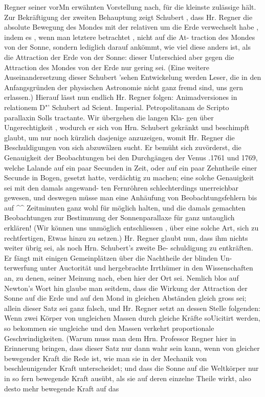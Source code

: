 \documentclass[12pt,a4paper]{article}
\begin{document}
Regner  seiner  vorMn  erwähnten  Vorstellung  nach,  für  die  kleinste  zulässige  hält.  Zur  Bekräftigung der  zweiten  Behauptung  zeigt  Schubert  ,  dass  Hr.  Regner  die  absolute  Bewegung  des  Mondes  mit  der relativen  um  die  Erde  verwechselt  habe ,  indem  es ,  wenn  man  letztere  betrachtet ,  nicht  auf  die  At- traction  des  Mondes  von  der  Sonne,  sondern  lediglich  darauf  ankömmt,  wie  viel  diese  anders  ist,  als die  Attraction  der  Erde  von  der  Sonne:  dieser  Unterschied  aber  gegen  die  Attraction  des  Mondes  von der  Erde  nur  gering  sei.  (Eine  weitere  Auseinandersetzung  dieser  Schubert 'sehen  Entwickelung  werden Leser,  die  in  den  Anfangsgründen  der  physischen  Astronomie  nicht  ganz  fremd  sind,  uns  gern  erlassen.) Hierauf  lässt  nun  endlich  Hr.  Regner  folgen:  Animadversiones  in  relationem  D"'  Schubert  ad Scient.  Imperial.  Petropolitanam  de  Scripto  parallaxin  Solls  tractante.  Wir  übergehen  die  langen  Kla- gen über  Ungerechtigkeit ,  wodurch  er  sich  von  Hrn.  Schubert  gekränkt  und  beschimpft  glaubt,  um  nur noch  kürzlich  dasjenige  anzuzeigen,  womit  Hr.  Regner  die  Beschuldigungen  von  sich  abzuwälzen  sucht. Er  bemüht  sich  zuvörderst,  die  Genauigkeit  der  Beobachtungen  bei  den  Durchgängen  der  Venus  .1761 und  1769,  welche  Lalande  auf  ein  paar  Secunden  in  Zeit,  oder  auf  ein  paar  Zehntheile  einer  Secunde in  Bogen,  gesetzt  hatte,  verdächtig  zu  machen;  eine  solche  Genauigkeit  sei  mit  den  damals  angewand- ten Fernröhren  schlechterdings  unerreichbar  gewesen,  und  deswegen  müsse  man  eine  Anhäufung  von Beobachtungsfehlern  bis  auf  \textasciicircum{}\textasciicircum{}  Zeitminuten  ganz  wohl  für  möglich  halten,  und  die  damals  gemachten Beobachtungen  zur  Bestimmung  der  Sonnenparallaxe  für  ganz  untauglich  erklären!  (Wir  können  uns unmöglich  entschliessen ,  über  eine  solche  Art,  sich  zu  rechtfertigen,  Etwas  hinzu  zu  setzen.) Hr.  Regner  glaubt  nun,  dass  ihm  nichts  weiter  übrig  sei,  als  noch  Hrn.  Schubert's  zweite  Be- schuldigung zu  entkräften.  Er  fängt  mit  einigen  Gemeinplätzen  über  die  Nachtheile  der  blinden  Un- terwerfung unter  Auctorität  und  hergebrachte  Irrthümer  in  den  Wissenschaften  an,  zu  denen,  seiner Meinung  nach,  eben  hier  der  Ort  sei.  Nemlich  blos  auf  Newton's  Wort  hin  glaube  man  seitdem,  dass die  Wirkung  der  Attraction  der  Sonne  auf  die  Erde  und  auf  den  Mond  in  gleichen  Abständen  gleich gross  sei;  allein  dieser  Satz  sei  ganz  falsch,  und  Hr.  Regner  setzt  an  dessen  Stelle  folgenden:  Wenn  zwei Körper  von  ungleichen  Massen  durch  gleiche  Kräfte  soUicitirt  werden,  so  bekommen  sie  ungleiche  und den  Massen  verkehrt  proportionale  Geschwindigkeiten.  (Warum  muss  man  dem  Hrn.  Professor  Regner hier  in  Erinnerung  bringen,  dass  dieser  Satz  nur  dann  wahr  sein  kann,  wenn  von  gleicher  bewegender Kraft  die  Rede  ist,  wie  man  sie  in  der  Mechanik  von  beschleunigender  Kraft  unterscheidet;  und  dass die  Sonne  auf  die  Weltkörper  nur  in  so  fern  bewegende  Kraft  ausübt,  als  sie  auf  deren  einzelne  Theile wirkt,  also  desto  mehr  bewegende  Kraft  auf  das  
\end{document}
